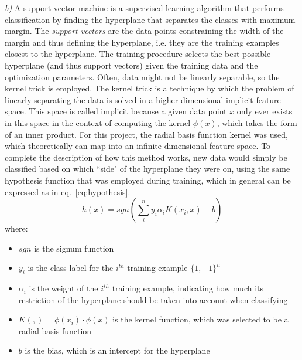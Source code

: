 \documentclass{article}
\begin{document}
\textit{b)}
A support vector machine is a supervised learning algorithm that performs classification by finding the hyperplane that separates the classes with maximum margin. The \textit{support vectors} are the data points constraining the width of the margin and thus defining the hyperplane, i.e. they are the training examples closest to the hyperplane. The training procedure selects the best possible hyperplane (and thus support vectors) given the training data and the optimization parameters. Often, data might not be linearly separable, so the kernel trick is employed. The kernel trick is a technique by which the problem of linearly separating the data is solved in a higher-dimensional implicit feature space. This space is called implicit because a given data point $x$ only ever exists in this space in the context of computing the kernel $\phi(x)$, which takes the form of an inner product. For this project, the radial basis function kernel was used, which theoretically can map into an infinite-dimensional feature space. To complete the description of how this method works, new data would simply be classified based on which ``side" of the hyperplane they were on, using the same hypothesis function that was employed during training, which in general can be expressed as in eq.~\ref{eq:hypothesis}.
\begin{equation}\label{eq:hypothesis}
h(x) = sgn(\sum_{i}^{n} y_i \alpha_i K(x_i, x) + b)
\end{equation}
where:
\begin{itemize}
    \item $sgn$ is the signum function
    \item $y_i$ is the class label for the $i^{th}$ training example $\{1, -1\}^n$
    \item $\alpha_i$ is the weight of the $i^{th}$ training example, indicating how much its restriction of the hyperplane should be taken into account when classifying
    \item $K(,) = \phi(x_i) \cdot \phi(x)$ is the kernel function, which was selected to be a radial basis function
    \item $b$ is the bias, which is an intercept for the hyperplane
\end{itemize}
\end{document}
